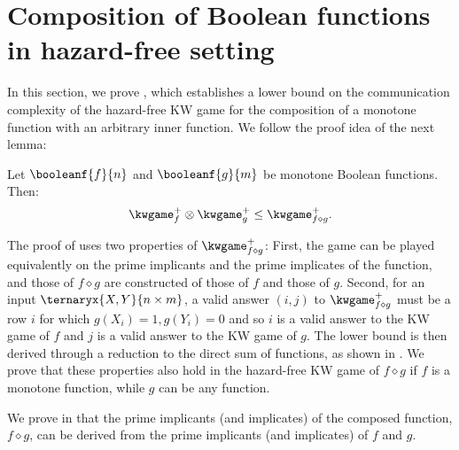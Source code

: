 \documentclass[acmsmall, nonacm, authorversion]{acmart}
\begin{document}
\section{Composition of Boolean functions in hazard-free setting}\label{sec:composition-hazard-free}
In this section, we prove , which establishes a lower bound on the communication complexity of the hazard-free KW game for the composition of a monotone function with an arbitrary inner function. We follow the proof idea of the next lemma:
\begin{lemma}\label{lem:composition-of-monotone-relations}
Let $\booleanf{f}{n}$ and $\booleanf{g}{m}$ be monotone Boolean functions. Then:
\[
\kwgame_{f}^+\otimes\kwgame_{g}^+\leq \kwgame^+_{f\diamond g}.
\]
\end{lemma}
The proof of  uses two properties of $\kwgame^+_{f\diamond g}$: First, the game can be played equivalently on the prime implicants and the prime implicates of the function, and those of $f\diamond g$ are constructed of those of $f$ and those of $g$. Second, for an input $\ternaryx{X,Y}{n\times m}$, a valid answer $(i,j)$ to $\kwgame^+_{f\diamond g}$ must be a row $i$ for which $g(X_i)=1, g(Y_i)=0$ and so $i$ is a valid answer to the KW game of $f$ and $j$ is a valid answer to the KW game of $g$.
The lower bound is then derived through a reduction to the direct sum of functions, as shown in \cite[Corollary 5]{KRW95}. We prove that these properties also hold in the hazard-free KW game of $f\diamond g$ if $f$ is a monotone function, while $g$ can be any function. 

We prove in  that the prime implicants (and implicates) of the composed function, $f\diamond g$, can be derived from the prime implicants (and implicates) of $f$ and $g$. 
\end{document}
